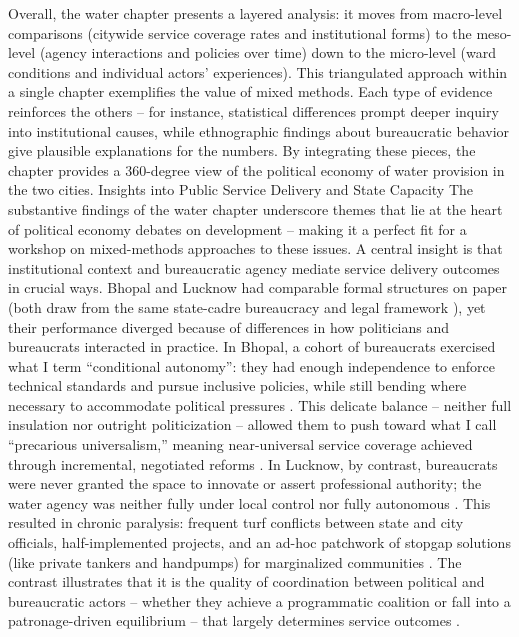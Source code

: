 Overall, the water chapter presents a layered analysis: it moves from macro-level comparisons (citywide service coverage rates and institutional forms) to the meso-level (agency interactions and policies over time) down to the micro-level (ward conditions and individual actors’ experiences). This triangulated approach within a single chapter exemplifies the value of mixed methods. Each type of evidence reinforces the others – for instance, statistical differences prompt deeper inquiry into institutional causes, while ethnographic findings about bureaucratic behavior give plausible explanations for the numbers. By integrating these pieces, the chapter provides a 360-degree view of the political economy of water provision in the two cities.
Insights into Public Service Delivery and State Capacity
The substantive findings of the water chapter underscore themes that lie at the heart of political economy debates on development – making it a perfect fit for a workshop on mixed-methods approaches to these issues. A central insight is that institutional context and bureaucratic agency mediate service delivery outcomes in crucial ways. Bhopal and Lucknow had comparable formal structures on paper (both draw from the same state-cadre bureaucracy and legal framework ), yet their performance diverged because of differences in how politicians and bureaucrats interacted in practice. In Bhopal, a cohort of bureaucrats exercised what I term “conditional autonomy”: they had enough independence to enforce technical standards and pursue inclusive policies, while still bending where necessary to accommodate political pressures . This delicate balance – neither full insulation nor outright politicization – allowed them to push toward what I call “precarious universalism,” meaning near-universal service coverage achieved through incremental, negotiated reforms . In Lucknow, by contrast, bureaucrats were never granted the space to innovate or assert professional authority; the water agency was neither fully under local control nor fully autonomous . This resulted in chronic paralysis: frequent turf conflicts between state and city officials, half-implemented projects, and an ad-hoc patchwork of stopgap solutions (like private tankers and handpumps) for marginalized communities  . The contrast illustrates that it is the quality of coordination between political and bureaucratic actors – whether they achieve a programmatic coalition or fall into a patronage-driven equilibrium – that largely determines service outcomes  .
